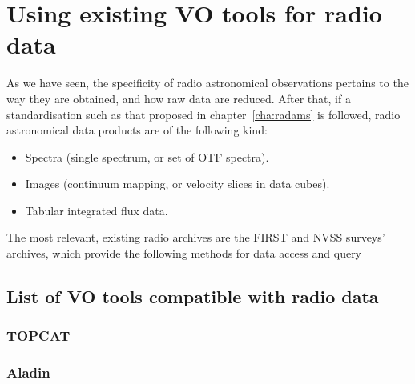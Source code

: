 \chapter{Using existing VO tools for radio data} %
\label{cha:using_existing_vo_tools_for_radio_data}

As we have seen, the specificity of radio astronomical observations
pertains to the way they are obtained, and how raw data are reduced.
After that, if a standardisation such as that proposed in 
chapter~\ref{cha:radams} is followed, radio astronomical data products
are of the following kind:

\begin{itemize}
	\item Spectra (single spectrum, or set of OTF spectra).
	
	\item Images (continuum mapping, or velocity slices in
	      data cubes).
	
	\item Tabular integrated flux data.
\end{itemize}

The most relevant, existing radio archives are the FIRST and NVSS
surveys' archives, which provide the following methods for data
access and query


\section{List of VO tools compatible with radio data} %
\label{sec:list_of_vo_tools_compatible_with_radio_data}

\subsection{TOPCAT} %
\label{sub:topcat}


\subsection{Aladin} %
\label{sub:aladin}



